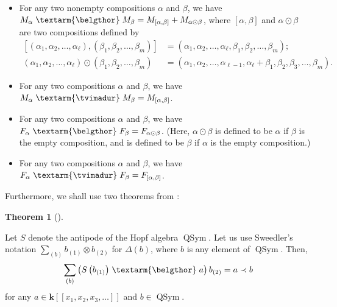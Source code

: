 \documentclass[numbers=enddot,12pt,final,onecolumn,notitlepage]{scrartcl}%
\theoremstyle{definition}
\newtheorem{theo}{Theorem}[section]
\newenvironment{theorem}[1][]
{\begin{theo}[#1]\begin{leftbar}}
{\end{leftbar}\end{theo}}
\newcommand{\tvi}{\left. \textarm{\tvimadur} \right.}
\newcommand{\bel}{\left. \textarm{\belgthor} \right.}
\let\sumnonlimits\sum
\renewcommand{\sum}{\sumnonlimits\limits}
\begin{document}
\begin{itemize}
\item For any two nonempty compositions $\alpha$ and $\beta$, we have
$M_{\alpha}\bel  M_{\beta}=M_{\left[  \alpha,\beta\right]  }+M_{\alpha
\odot\beta}$, where $\left[  \alpha,\beta\right]  $ and $\alpha\odot\beta$ are
two compositions defined by%
\begin{align*}
\left[  \left(  \alpha_{1},\alpha_{2},\ldots,\alpha_{\ell}\right)  ,\left(
\beta_{1},\beta_{2},\ldots,\beta_{m}\right)  \right]   &  =\left(  \alpha
_{1},\alpha_{2},\ldots,\alpha_{\ell},\beta_{1},\beta_{2},\ldots,\beta
_{m}\right)  ;\\
\left(  \alpha_{1},\alpha_{2},\ldots,\alpha_{\ell}\right)  \odot\left(
\beta_{1},\beta_{2},\ldots,\beta_{m}\right)   &  =\left(  \alpha_{1}%
,\alpha_{2},\ldots,\alpha_{\ell-1},\alpha_{\ell}+\beta_{1},\beta_{2},\beta
_{3},\ldots,\beta_{m}\right)  .
\end{align*}


\item For any two compositions $\alpha$ and $\beta$, we have $M_{\alpha
}\tvi  M_{\beta}=M_{\left[  \alpha,\beta\right]  }$.

\item For any two compositions $\alpha$ and $\beta$, we have $F_{\alpha
}\bel  F_{\beta}=F_{\alpha\odot\beta}$. (Here, $\alpha\odot\beta$ is defined
to be $\alpha$ if $\beta$ is the empty composition, and is defined to be
$\beta$ if $\alpha$ is the empty composition.)

\item For any two compositions $\alpha$ and $\beta$, we have $F_{\alpha
}\tvi  F_{\beta}=F_{\left[  \alpha,\beta\right]  }$.
\end{itemize}

Furthermore, we shall use two theorems from \cite[detailed version, Section
3]{dimcr}:

\begin{theorem}
\label{thm.beldend}Let $S$ denote the antipode of the Hopf algebra
$\operatorname*{QSym}$. Let us use Sweedler's notation $\sum_{\left(
b\right)  }b_{\left(  1\right)  }\otimes b_{\left(  2\right)  }$ for
$\Delta\left(  b\right)  $, where $b$ is any element of $\operatorname*{QSym}%
$. Then,%
\[
\sum_{\left(  b\right)  }\left(  S\left(  b_{\left(  1\right)  }\right)
\bel  a\right)  b_{\left(  2\right)  }=a\left.  \prec\right.  b
\]
for any $a\in\mathbf{k}\left[  \left[  x_{1},x_{2},x_{3},\ldots\right]
\right]  $ and $b\in\operatorname*{QSym}$.
\end{theorem}
\end{document}
